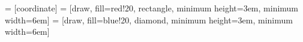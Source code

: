 
 = [coordinate] %
 = [draw, fill=red!20, rectangle, minimum height=3em, minimum width=6em] %
 = [draw, fill=blue!20, diamond, minimum height=3em, minimum width=6em] %
